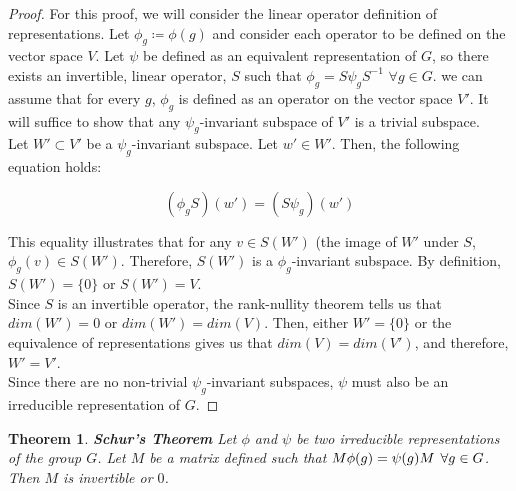 \documentclass[10pt]{ucthesis}
\newtheorem{theorem}[definition]{Theorem}
\begin{document}
\begin{proof}For this proof, we will consider the linear operator definition of representations. Let $\phi_g \coloneq \phi(g)$ and consider each operator to be defined on the vector space $V$. Let $\psi$ be defined as an equivalent representation of $G$, so there exists an invertible, linear operator, $S$ such that $\phi_g = S\psi_g S^{-1}$ $\forall g \in G$. we can assume that for every $g$, $\phi_g$ is defined as an operator on the vector space $V'$. It will suffice to show that any $\psi_g$-invariant subspace of $V'$ is a trivial subspace. \\

Let $W' \subset V'$ be a $\psi_g$-invariant subspace. Let $w' \in W'$. Then, the following equation holds:

$$(\phi_gS)(w') = (S\psi_g)(w')$$

This equality illustrates that for any $v \in S(W')$ (the image of $W'$ under $S$, $\phi_g (v) \in S(W')$. Therefore, $S(W')$ is a $\phi_g$-invariant subspace. By definition, $S(W') = \{0\}$ or $S(W') = V$. \\

Since $S$ is an invertible operator, the rank-nullity theorem tells us that $dim(W')=0$ or $dim(W') = dim(V)$. Then, either $W' = \{0\}$ or the equivalence of representations gives us that $dim(V)=dim(V')$, and therefore, $W' = V'$. \\

Since there are no non-trivial $\psi_g$-invariant subspaces, $\psi$ must also be an irreducible representation of $G$. \end{proof}



\begin{theorem} \textbf{Schur's Theorem}
	Let $\phi$ and $\psi$ be two irreducible representations of the group $G$. Let $M$ be a matrix defined such that $M\phi(g) = \psi(g)M \hspace{1.5mm}\forall g \in G$. Then $M$ is invertible or $0$. 
\end{theorem}
\end{document}

